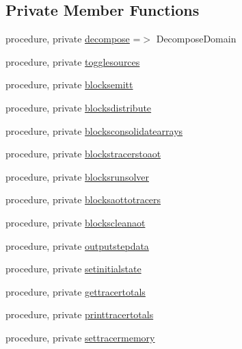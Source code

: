 \subsection*{Private Member Functions}
\begin{DoxyCompactItemize}
\item 
procedure, private \mbox{\hyperlink{structsimulation__mod_1_1simulation__class_a559d8d450db2c6b568cb6e0e4dbab350}{decompose}} =$>$ Decompose\+Domain
\item 
procedure, private \mbox{\hyperlink{structsimulation__mod_1_1simulation__class_a2394700a952ccf667b61d53764c73a54}{togglesources}}
\item 
procedure, private \mbox{\hyperlink{structsimulation__mod_1_1simulation__class_a6e740eee52324299ca5f6acd98d0c657}{blocksemitt}}
\item 
procedure, private \mbox{\hyperlink{structsimulation__mod_1_1simulation__class_a06672383d5978e81af6836eb6ebfd46a}{blocksdistribute}}
\item 
procedure, private \mbox{\hyperlink{structsimulation__mod_1_1simulation__class_a8280bb9b6d664b82c58d0a41c7ffc3cd}{blocksconsolidatearrays}}
\item 
procedure, private \mbox{\hyperlink{structsimulation__mod_1_1simulation__class_a86fd4b37e89c2ecbcdef93b156d83fc4}{blockstracerstoaot}}
\item 
procedure, private \mbox{\hyperlink{structsimulation__mod_1_1simulation__class_aa4e34759252b0517c37c79c95ece1167}{blocksrunsolver}}
\item 
procedure, private \mbox{\hyperlink{structsimulation__mod_1_1simulation__class_a76130621d9de5c88e1af063a21b4afa6}{blocksaottotracers}}
\item 
procedure, private \mbox{\hyperlink{structsimulation__mod_1_1simulation__class_a1b9db63a26711c01fc0e994c39a7ae1a}{blockscleanaot}}
\item 
procedure, private \mbox{\hyperlink{structsimulation__mod_1_1simulation__class_aaef8771dbe443c43b1355437bfa9ef4a}{outputstepdata}}
\item 
procedure, private \mbox{\hyperlink{structsimulation__mod_1_1simulation__class_aeb84b150c76e399c3dc33fbc3f7874ae}{setinitialstate}}
\item 
procedure, private \mbox{\hyperlink{structsimulation__mod_1_1simulation__class_ab22e46320d4a3dd0f2739894d1165a85}{gettracertotals}}
\item 
procedure, private \mbox{\hyperlink{structsimulation__mod_1_1simulation__class_a8ddba2b86c2137f5dfc7fcd301badd66}{printtracertotals}}
\item 
procedure, private \mbox{\hyperlink{structsimulation__mod_1_1simulation__class_a7cabf864e327d6e35f6cb7bd85b1db6a}{settracermemory}}
\end{DoxyCompactItemize}
